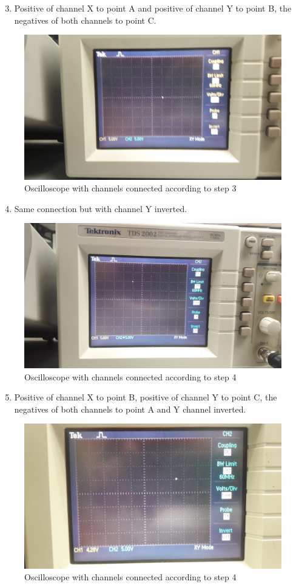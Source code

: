 \documentclass[letterpaper]{article}
\begin{document}
\begin{enumerate}
    \setcounter{enumi}{2}
\item Positive of channel X to point A and positive of channel Y to point B, the negatives of both
channels to point C.
\end{enumerate}
\begin{figure}[H]
    \centering
    \includegraphics[width=.7\linewidth,angle=180]{img/part3/3}
    \caption{Oscilloscope with channels connected according to step 3}
\end{figure}
\begin{enumerate}
    \setcounter{enumi}{3}
\item Same connection but with channel Y inverted.
\end{enumerate}
\begin{figure}[H]
    \centering
    \includegraphics[width=.7\linewidth]{img/part3/5}
    \caption{Oscilloscope with channels connected according to step 4}
\end{figure}
\begin{enumerate}
    \setcounter{enumi}{4}
\item Positive of channel X to point B, positive of channel Y to point C, the negatives of both
channels to point A and Y channel inverted.
\end{enumerate}
\begin{figure}[H]
    \centering
    \includegraphics[width=.7\linewidth]{img/part3/1}
    \caption{Oscilloscope with channels connected according to step 4}
\end{figure}
\end{document}
